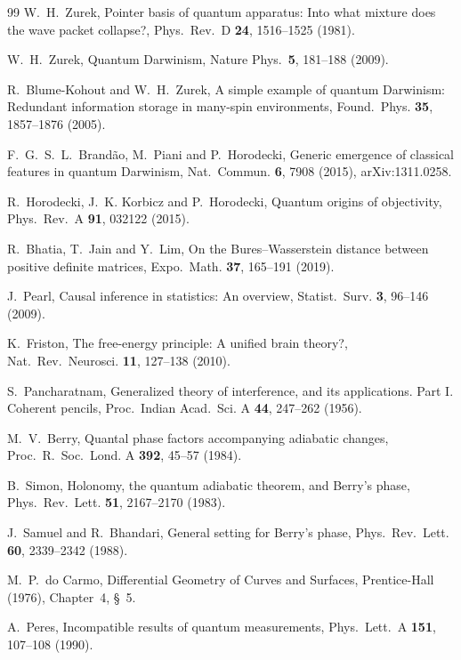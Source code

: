 \documentclass[aps,pra,onecolumn,superscriptaddress,nofootinbib,10pt]{revtex4-2}
\theoremstyle{definition}
\theoremstyle{remark}
\begin{document}
\begin{thebibliography}{99}
 W.~H.~Zurek, Pointer basis of quantum apparatus: Into what mixture does the wave packet collapse?, Phys.\ Rev.\ D \textbf{24}, 1516--1525 (1981).

 W.~H.~Zurek, Quantum Darwinism, Nature Phys.\ \textbf{5}, 181--188 (2009).

 R.~Blume-Kohout and W.~H.~Zurek, A simple example of quantum Darwinism: Redundant information storage in many-spin environments, Found.\ Phys. \textbf{35}, 1857--1876 (2005).

 F.~G.~S.~L.~Brand\~ao, M.~Piani and P.~Horodecki, Generic emergence of classical features in quantum Darwinism, Nat.\ Commun. \textbf{6}, 7908 (2015), arXiv:1311.0258.

 R.~Horodecki, J.~K. Korbicz and P.~Horodecki, Quantum origins of objectivity, Phys.\ Rev.\ A \textbf{91}, 032122 (2015).

 R.~Bhatia, T.~Jain and Y.~Lim, On the Bures--Wasserstein distance between positive definite matrices, Expo.\ Math. \textbf{37}, 165--191 (2019).

 J.~Pearl, Causal inference in statistics: An overview, Statist.\ Surv. \textbf{3}, 96--146 (2009).

 K.~Friston, The free-energy principle: A unified brain theory?, Nat.\ Rev.\ Neurosci. \textbf{11}, 127--138 (2010).

 S.~Pancharatnam, Generalized theory of interference, and its applications. Part I. Coherent pencils, Proc.\ Indian Acad.\ Sci. A \textbf{44}, 247--262 (1956).

 M.~V.~Berry, Quantal phase factors accompanying adiabatic changes, Proc.\ R.\ Soc.\ Lond. A \textbf{392}, 45--57 (1984).

 B.~Simon, Holonomy, the quantum adiabatic theorem, and Berry's phase, Phys.\ Rev.\ Lett. \textbf{51}, 2167--2170 (1983).

 J.~Samuel and R.~Bhandari, General setting for Berry's phase, Phys.\ Rev.\ Lett. \textbf{60}, 2339--2342 (1988).

 M.~P.~do Carmo, Differential Geometry of Curves and Surfaces, Prentice-Hall (1976), Chapter~4, \S~5.

 A.~Peres, Incompatible results of quantum measurements, Phys.\ Lett.\ A \textbf{151}, 107--108 (1990).


\end{thebibliography}
\end{document}
